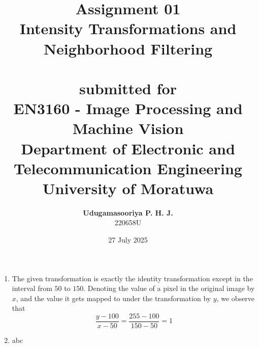\documentclass{article}[a4paper]
\title{
	\huge{\textbf{
		Assignment 01
	}}\\
	\Large{
		Intensity Transformations and Neighborhood Filtering
	}\\
	\phantom{}\\
	\large{
		submitted for
	}\\
	\Large{
		\textbf{EN3160 - Image Processing and Machine Vision}
	}\\
	\large{
		Department of Electronic and Telecommunication Engineering
	}
	\\
	\large{University of Moratuwa}
}
\author{
	\textbf{Udugamasooriya P. H. J.}\\
	220658U\\
}
\date{27 July 2025}
\begin{document}
\maketitle

\begin{enumerate}
	\item The given transformation is exactly the identity transformation except in the interval from $50$ to $150$. Denoting the
	value of a pixel in the original image by $x$, and the value it gets mapped to under the transformation by $y$, we observe that \[
		\dfrac{y - 100}{x - 50} = \dfrac{255 - 100}{150 - 50} = 1
	\]

	\item abc
\end{enumerate}
\end{document}
